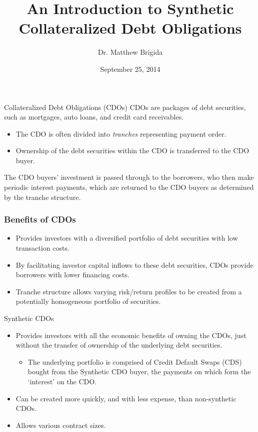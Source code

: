 \documentclass[xcolor=dvipsnames]{beamer}
\title[Synthetic CDOs]{An Introduction to Synthetic Collateralized Debt Obligations}
\author{Dr. Matthew Brigida}
\institute{
	Department of Finance \\
	College of Business Administration \\
	Clarion University of Pennsylvania  \\
	Clarion, PA 16214 \\
	\texttt{mbrigida@clarion.edu}
}
\date{September 25, 2014}
\begin{document}
\begin{frame}[plain]
\titlepage
\end{frame}

%
%

\begin{frame}{Collateralized Debt Obligations (CDOs)}
CDOs are packages of debt securities, such as mortgages, auto loans, and credit card receivables.  
\begin{itemize}
\item The CDO is often divided into {\it tranches} representing payment order.  
\item Ownership of the debt securities within the CDO is transferred to the CDO buyer.  
\end{itemize}
The CDO buyers' investment is passed through to the borrowers, who then make periodic interest payments, which are returned to the CDO buyers as determined by the tranche structure.
\end{frame}
\begin{frame}
  \frametitle{Benefits of CDOs}
  \begin{itemize}
  \item Provides investors with a diversified portfolio of debt securities with low transaction costs. 
  \item By facilitating investor capital inflows to these debt securities, CDOs provide borrowers with lower financing costs.
  \item Tranche structure allows varying risk/return profiles to be created from a potentially homogeneous portfolio of securities.
  \end{itemize}
\end{frame}
\begin{frame}{Synthetic CDOs}
\begin{itemize}
\item Provides investors with all the economic benefits of owning the CDOs, just without the transfer of ownership of the underlying debt securities.
\begin{itemize}
\item  The underlying portfolio is comprised of Credit Default Swaps (CDS) bought from the Synthetic CDO buyer, the payments on which form the `interest' on the CDO.
\end{itemize}
\item Can be created more quickly, and with less expense, than non-synthetic CDOs.
\item Allows various contract sizes.
\end{itemize}
\end{frame}
\end{document}
